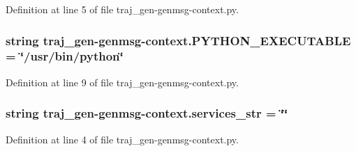 Definition at line 5 of file traj\+\_\+gen-\/genmsg-\/context.\+py.

\subsubsection[{\texorpdfstring{P\+Y\+T\+H\+O\+N\+\_\+\+E\+X\+E\+C\+U\+T\+A\+B\+LE}{PYTHON_EXECUTABLE}}]{\setlength{\rightskip}{0pt plus 5cm}string traj\+\_\+gen-\/genmsg-\/context.\+P\+Y\+T\+H\+O\+N\+\_\+\+E\+X\+E\+C\+U\+T\+A\+B\+LE = \char`\"{}/usr/bin/python\char`\"{}}\hypertarget{namespacetraj__gen-genmsg-context_a35a5b37a567194e82b36cfe55c253a92}{}\label{namespacetraj__gen-genmsg-context_a35a5b37a567194e82b36cfe55c253a92}


Definition at line 9 of file traj\+\_\+gen-\/genmsg-\/context.\+py.

\subsubsection[{\texorpdfstring{services\+\_\+str}{services_str}}]{\setlength{\rightskip}{0pt plus 5cm}string traj\+\_\+gen-\/genmsg-\/context.\+services\+\_\+str = \char`\"{}\char`\"{}}\hypertarget{namespacetraj__gen-genmsg-context_a61b5ee79b98f6990ece4339523c314cd}{}\label{namespacetraj__gen-genmsg-context_a61b5ee79b98f6990ece4339523c314cd}


Definition at line 4 of file traj\+\_\+gen-\/genmsg-\/context.\+py.

